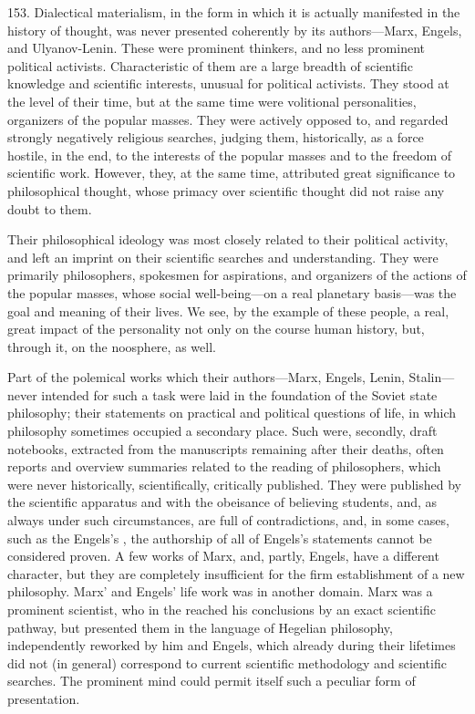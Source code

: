 153. Dialectical materialism, in the form in which it is actually manifested in
the history of thought, was never presented coherently by its authors---Marx,
Engels, and Ulyanov-Lenin.  These were prominent thinkers, and no less
prominent political activists.  Characteristic of them are a large breadth of
scientific knowledge and scientific interests, unusual for political activists.
They stood at the level of their time, but at the same time were volitional
personalities, organizers of the popular masses.  They were actively opposed
to, and regarded strongly negatively religious searches, judging them,
historically, as a force hostile, in the end, to the interests of the popular
masses and to the freedom of scientific work.  However, they, at the same time,
attributed great significance to philosophical thought, whose primacy over
scientific thought did not raise any doubt to them.

Their philosophical ideology was most closely related to their political
activity, and left an imprint on their scientific searches and understanding.
They were primarily philosophers, spokesmen for aspirations, and
organizers of the actions of the popular masses, whose social well-being---on a
real planetary basis---was the goal and meaning of their lives.  We see, by the
example of these people, a real, great impact of the personality not only on
the course human history, but, through it, on the noosphere, as well.

Part of the polemical works which their authors---Marx, Engels, Lenin,
Stalin---never intended for such a task were laid in the foundation of the
Soviet state philosophy; their statements on practical and political questions
of life, in which philosophy sometimes occupied a secondary place.  Such were,
secondly, draft notebooks, extracted from the manuscripts remaining after their
deaths, often reports and overview summaries related to the reading of
philosophers, which were never historically, scientifically, critically
published.  They were published by the scientific apparatus and with the
obeisance of believing students, and, as always under such circumstances, are
full of contradictions, and, in some cases, such as the Engels's
, the authorship of all of Engels's statements
cannot be considered proven.  A few works of Marx, and, partly, Engels, have a
different character, but they are completely insufficient for the firm
establishment of a new philosophy.  Marx' and Engels' life work was in another
domain.  Marx was a prominent scientist, who in the  reached
his conclusions by an exact scientific pathway, but presented them in the
language of Hegelian philosophy, independently reworked by him and Engels,
which already during their lifetimes did not (in general) correspond to current
scientific methodology and scientific searches.  The prominent mind could
permit itself such a peculiar form of presentation.

